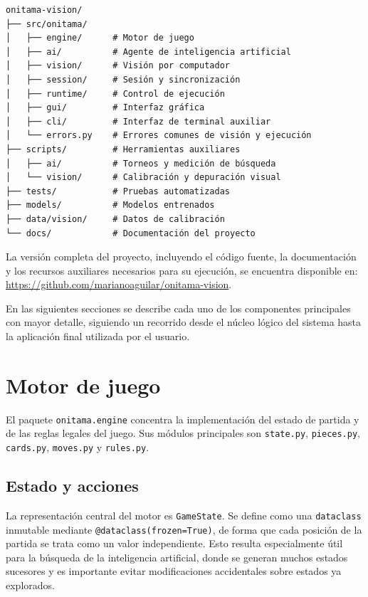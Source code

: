 \begin{verbatim}
onitama-vision/
├── src/onitama/
│   ├── engine/      # Motor de juego
│   ├── ai/          # Agente de inteligencia artificial
│   ├── vision/      # Visión por computador
│   ├── session/     # Sesión y sincronización
│   ├── runtime/     # Control de ejecución
│   ├── gui/         # Interfaz gráfica
│   ├── cli/         # Interfaz de terminal auxiliar
│   └── errors.py    # Errores comunes de visión y ejecución
├── scripts/         # Herramientas auxiliares
│   ├── ai/          # Torneos y medición de búsqueda
│   └── vision/      # Calibración y depuración visual
├── tests/           # Pruebas automatizadas
├── models/          # Modelos entrenados
├── data/vision/     # Datos de calibración
└── docs/            # Documentación del proyecto
\end{verbatim}

La versión completa del proyecto, incluyendo el código fuente, la documentación y los recursos auxiliares necesarios para su ejecución, se encuentra disponible en: \url{https://github.com/marianoaguilar/onitama-vision}.

En las siguientes secciones se describe cada uno de los componentes principales con mayor detalle, siguiendo un recorrido desde el núcleo lógico del sistema hasta la aplicación final utilizada por el usuario.


\section{Motor de juego}
\label{sec:motor-juego}

El paquete \texttt{onitama.engine} concentra la implementación del estado de partida y de las reglas legales del juego. Sus módulos principales son \texttt{state.py}, \texttt{pieces.py}, \texttt{cards.py}, \texttt{moves.py} y \texttt{rules.py}.

\subsection{Estado y acciones}
\label{subsec:estado-acciones}

La representación central del motor es \texttt{GameState}. Se define como una \texttt{dataclass} inmutable mediante \texttt{@dataclass(frozen=True)}, de forma que cada posición de la partida se trata como un valor independiente. Esto resulta especialmente útil para la búsqueda de la inteligencia artificial, donde se generan muchos estados sucesores y es importante evitar modificaciones accidentales sobre estados ya explorados.


